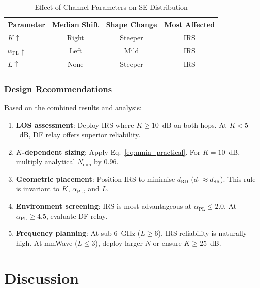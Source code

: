 \documentclass[journal]{IEEEtran} %
\begin{document}
\begin{table}[t]
\caption{Effect of Channel Parameters on SE Distribution}
\label{tab:cdf_effects}
\centering
\begin{tabular}{@{}lccc@{}}
\toprule
Parameter & Median Shift & Shape Change & Most Affected \\
\midrule
$K \uparrow$                   & Right  & Steeper & IRS \\
$\alpha_{\mathrm{PL}} \uparrow$ & Left   & Mild    & IRS \\
$L \uparrow$                   & None   & Steeper & IRS \\
\bottomrule
\end{tabular}
\end{table}

\subsubsection{Design Recommendations}

Based on the combined results and analysis:
\begin{enumerate}
    \item \textbf{LOS assessment}: Deploy IRS where $K \geq 10$~dB on both hops. At $K < 5$~dB, DF relay offers superior reliability.
    \item \textbf{$K$-dependent sizing}: Apply Eq.~\eqref{eq:nmin_practical}. For $K = 10$~dB, multiply analytical $N_{\mathrm{min}}$ by 0.96.
    \item \textbf{Geometric placement}: Position IRS to minimise $d_{\mathrm{RD}}$ ($d_1 \approx d_{\mathrm{SR}}$). This rule is invariant to $K$, $\alpha_{\mathrm{PL}}$, and $L$.
    \item \textbf{Environment screening}: IRS is most advantageous at $\alpha_{\mathrm{PL}} \leq 2.0$. At $\alpha_{\mathrm{PL}} \geq 4.5$, evaluate DF relay.
    \item \textbf{Frequency planning}: At sub-6~GHz ($L \geq 6$), IRS reliability is naturally high. At mmWave ($L \leq 3$), deploy larger $N$ or ensure $K \geq 25$~dB.
\end{enumerate}
\section{Discussion}
\label{sec:discussion}
\end{document}
